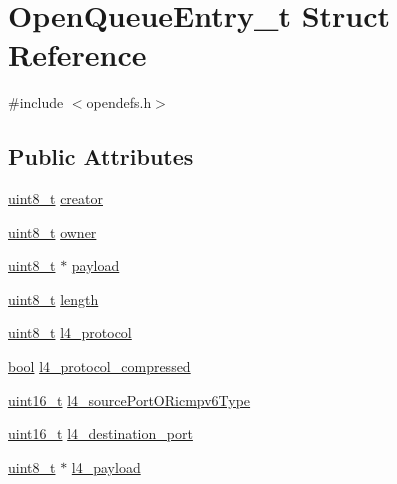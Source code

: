\hypertarget{struct_open_queue_entry__t}{}\section{Open\+Queue\+Entry\+\_\+t Struct Reference}
\label{struct_open_queue_entry__t}


{\ttfamily \#include $<$opendefs.\+h$>$}

\subsection*{Public Attributes}
\begin{DoxyCompactItemize}
\item 
\hyperlink{_p_e___types_8h_aba7bc1797add20fe3efdf37ced1182c5}{uint8\+\_\+t} \hyperlink{struct_open_queue_entry__t_a366cbf6a9ee46d24a60d7708861fd597}{creator}
\item 
\hyperlink{_p_e___types_8h_aba7bc1797add20fe3efdf37ced1182c5}{uint8\+\_\+t} \hyperlink{struct_open_queue_entry__t_af07aeb39aa9de8e0d4c64f0083f42935}{owner}
\item 
\hyperlink{_p_e___types_8h_aba7bc1797add20fe3efdf37ced1182c5}{uint8\+\_\+t} $\ast$ \hyperlink{struct_open_queue_entry__t_aeeaf66f25c665e41a219c4097e5085da}{payload}
\item 
\hyperlink{_p_e___types_8h_aba7bc1797add20fe3efdf37ced1182c5}{uint8\+\_\+t} \hyperlink{struct_open_queue_entry__t_aa3cf5004f2ac9ef3a888f42e726a5cce}{length}
\item 
\hyperlink{_p_e___types_8h_aba7bc1797add20fe3efdf37ced1182c5}{uint8\+\_\+t} \hyperlink{struct_open_queue_entry__t_adbf27c6999f985512356b1f5732ffd98}{l4\+\_\+protocol}
\item 
\hyperlink{_p_e___types_8h_a97a80ca1602ebf2303258971a2c938e2}{bool} \hyperlink{struct_open_queue_entry__t_a001217b60ab067859b164520a37f0250}{l4\+\_\+protocol\+\_\+compressed}
\item 
\hyperlink{_p_e___types_8h_a1f1825b69244eb3ad2c7165ddc99c956}{uint16\+\_\+t} \hyperlink{struct_open_queue_entry__t_a30e8edde6091680fb6c03fdb5f27d92f}{l4\+\_\+source\+Port\+O\+Ricmpv6\+Type}
\item 
\hyperlink{_p_e___types_8h_a1f1825b69244eb3ad2c7165ddc99c956}{uint16\+\_\+t} \hyperlink{struct_open_queue_entry__t_a0f202aff0fad9c64f4496051f9ecd601}{l4\+\_\+destination\+\_\+port}
\item 
\hyperlink{_p_e___types_8h_aba7bc1797add20fe3efdf37ced1182c5}{uint8\+\_\+t} $\ast$ \hyperlink{struct_open_queue_entry__t_a1c9c4a2da1e43eb8d9fd2b310f9f524e}{l4\+\_\+payload}

\end{DoxyCompactItemize}
